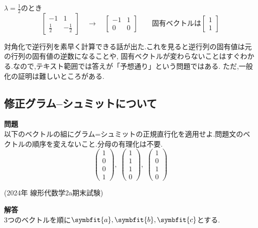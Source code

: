 $\lambda=\frac{1}{2}$のとき
\[
\begin{bmatrix}-1 & 1 \\ \frac{1}{2} & -\frac{1}{2}\end{bmatrix} 
\quad \rightarrow \quad
\begin{bmatrix}-1 & 1 \\ 0 & 0\end{bmatrix} \qquad 
\text{固有ベクトルは}\begin{bmatrix}
    1 \\ 1
\end{bmatrix}
\]
\begin{tcolorbox}[colframe=black!80,colback=white,title=摘要]
    \hspace{1em}
    対角化で逆行列を素早く計算できる話が出た.これを見ると逆行列の固有値は元の行列の固有値の逆数になることや,
    固有ベクトルが変わらないことはすぐわかる.なので,テキスト範囲では答えが「予想通り」という問題ではある.
    ただ,一般化の証明は難しいところがある.
\end{tcolorbox}
\subsection{修正グラム--シュミットについて}
\noindent
\textbf{問題}\\
\hspace{1em}
以下のベクトルの組にグラム=シュミットの正規直行化を適用せよ.問題文のベクトルの順序を変えないこと.分母の有理化は不要.\\
    \[\begin{pmatrix}1 \\ 0 \\ 0 \\ 1\end{pmatrix},\;
    \begin{pmatrix}1 \\ 1 \\ 1 \\ 0\end{pmatrix},\;
    \begin{pmatrix}1 \\ 0 \\ 1 \\ 0\end{pmatrix}\]
\begin{flushright}
    (2024年 線形代数学2a期末試験)
\end{flushright}
\vspace{2cm}
\textbf{解答}\\
\hspace{1em}
3つのベクトルを順に$\symbfit{a},\symbfit{b},\symbfit{c}$とする.
